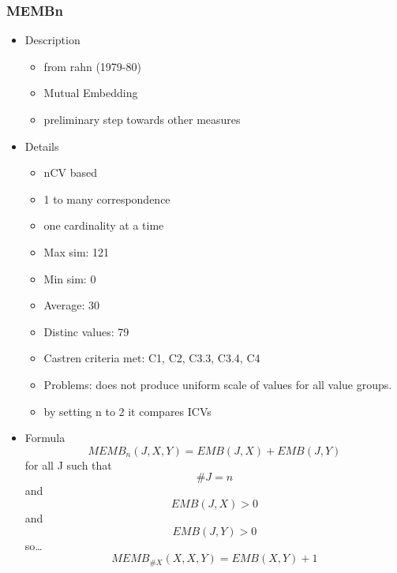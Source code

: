 \documentclass{article}
\begin{document}
\subsubsection{MEMBn}
\label{sec-6-6-2}
\begin{itemize}

\item Description
\label{sec-6-6-2-1}%
\begin{itemize}
\item from rahn (1979-80)
\item Mutual Embedding
\item preliminary step towards other measures
\end{itemize}

\item Details
\label{sec-6-6-2-2}%
\begin{itemize}
\item nCV based
\item 1 to many correspondence
\item one cardinality at a time
\item Max sim: 121
\item Min sim: 0
\item Average: 30
\item Distinc values: 79
\item Castren criteria met: C1, C2, C3.3, C3.4, C4
\item Problems: does not produce uniform scale of values for all value
  groups.
\item by setting n to 2 it compares ICVs
\end{itemize}

\item Formula\\
\label{sec-6-6-2-3}%
$$ MEMB_{n}\left(J,X,Y\right)=EMB\left(J,X\right)+EMB\left(J,Y\right) $$
for all J such that
$$ \#J=n $$
and
$$ EMB\left(J,X\right)>0 $$ and $$ EMB\left(J,Y\right)>0 $$
so\ldots{}
$$ MEMB_{\#X}\left( X,X,Y \right)=EMB\left( X,Y \right) + 1 $$
\end{itemize} %
\end{document}
